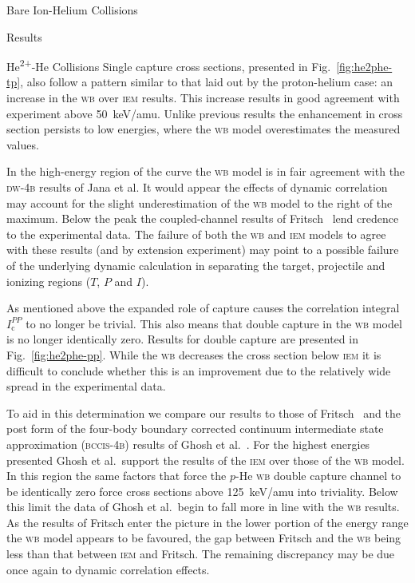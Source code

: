 \documentclass[a5paper, 9 pt]{extreport}
\begin{document}
\begin{chapter}{Bare Ion-Helium Collisions \label{chap:p-he2p-he}}
\begin{section}{Results \label{sec:phe2p-res}}
\begin{subsection}{\texorpdfstring{He\textsuperscript{2+}}{He2+}-He Collisions
                         \label{sec:he2phe-res}}
         Single capture cross sections, presented in Fig.~\ref{fig:he2phe-tp}, also follow a pattern
         similar to that laid out by the proton-helium case: an increase in the \textsc{wb} over
         \textsc{iem} results. This increase results in good agreement with experiment above 50~keV/amu.
         Unlike previous results the enhancement in cross section persists to low energies, where the
         \textsc{wb} model overestimates the measured values.

         In the high-energy region of the curve the \textsc{wb} model is in fair agreement with the
         \textsc{dw-4b} results of Jana et al. It would appear the effects of dynamic correlation may
         account for the slight underestimation of the \textsc{wb} model to the right of the maximum.
         Below the peak the coupled-channel results of Fritsch~\cite{Fritsch-94} lend credence to the
         experimental data. The failure of both the \textsc{wb} and \textsc{iem} models to agree with
         these results (and by extension experiment) may point to a possible failure of the underlying
         dynamic calculation in separating the target, projectile and ionizing regions ($T$, $P$ and
         $I$).

         As mentioned above the expanded role of capture causes the correlation integral
         $I^{PP}_\mathrm{c}$ to no longer be trivial. This also means that double capture in the
         \textsc{wb} model is no longer identically zero. Results for double capture are presented in
         Fig.~\ref{fig:he2phe-pp}. While the \textsc{wb} decreases the cross section below \textsc{iem}
         it is difficult to conclude whether this is an improvement due to the relatively wide spread in
         the experimental data.

         To aid in this determination we compare our results to those of Fritsch~\cite{Fritsch-94} and
         the post form of the four-body boundary corrected continuum intermediate state approximation
         (\textsc{bccis-4b}) results of Ghosh et al.~\cite{GDMP-08}. For the highest energies presented
         Ghosh et al.\ support the results of the \textsc{iem} over those of the \textsc{wb} model. In
         this region the same factors that force the $p$-He \textsc{wb} double capture channel to be
         identically zero force cross sections above 125~keV/amu into triviality. Below this limit the
         data of Ghosh et al.\ begin to fall more in line with the \textsc{wb} results. As the results
         of Fritsch enter the picture in the lower portion of the energy range the \textsc{wb} model
         appears to be favoured, the gap between Fritsch and the \textsc{wb} being less than that
         between \textsc{iem} and Fritsch. The remaining discrepancy may be due once again to dynamic
         correlation effects.


\end{subsection}
\end{section}
\end{chapter}
\end{document}
